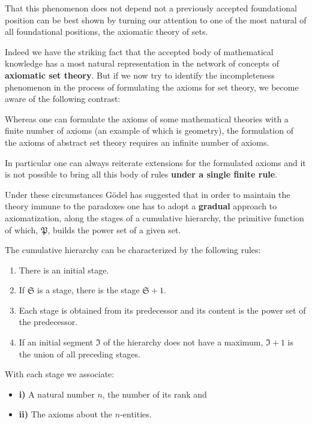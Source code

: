\documentclass[12pt]{article}
\begin{document}
That this phenomenon does not depend not a previously accepted foundational position can be best shown by turning our attention to one of the most natural of all foundational positions, the axiomatic theory of sets.

Indeed we have the striking fact that the accepted body of mathematical knowledge has a most natural representation in the network of concepts of \textbf{axiomatic set theory}. But if we now try to identify the incompleteness phenomenon in the process of formulating the axioms for set theory, we become aware of the following contrast:

Whereas one can formulate the axioms of some mathematical theories with a finite number of axioms (an example of which is geometry), the formulation of the axioms of abstract set theory requires an infinite number of axioms.

In particular one can always reiterate extensions for the formulated axioms and it is not possible to bring all this body of rules \textbf{under a single finite rule}.

Under these circumstances G\"{o}del has suggested that in order to maintain the theory immune to the paradoxes one has to adopt a \textbf{gradual} approach to axiomatization, along the stages of a cumulative hierarchy, the primitive function of which, $\mathfrak{P}$, builds the power set of a given set.

The cumulative  hierarchy can be characterized by the following rules:

\begin{enumerate}
\item There is an initial stage. 

\item If $\mathfrak{S}$ is a stage, there is the stage $\mathfrak{S}+1$.

\item Each stage is obtained from its predecessor and its content is the power set of the predecessor.

\item If an initial segment $\mathfrak{I}$ of the hierarchy does not have a maximum, $\mathfrak{I}+1$ is the union of all preceding stages.
\end{enumerate}

With each stage we associate:

\begin{itemize}
\item \textbf{i)} A natural number $n$, the number of its rank and 
 
\item \textbf{ii)} The axioms about the $n$-entities.
\end{itemize}
\end{document}
